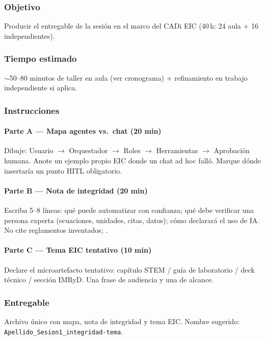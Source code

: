 \subsubsection*{Objetivo}
Producir el entregable de la sesión en el marco del CADi EIC (40\,h: 24 aula + 16 independientes).

\subsubsection*{Tiempo estimado}
$\sim$50--80 minutos de taller en aula (ver cronograma) + refinamiento en trabajo independiente si aplica.

\subsubsection*{Instrucciones}
\paragraph{Parte A --- Mapa agentes vs.\ chat (20 min)} Dibuje: Usuario $\rightarrow$ Orquestador $\rightarrow$ Roles $\rightarrow$ Herramientas $\rightarrow$ Aprobación humana. Anote un ejemplo propio EIC donde un chat ad hoc falló. Marque dónde insertaría un punto HITL obligatorio.
\paragraph{Parte B --- Nota de integridad (20 min)} Escriba 5--8 líneas: qué puede automatizar con confianza; qué debe verificar una persona experta (ecuaciones, unidades, citas, datos); cómo declarará el uso de IA. No cite reglamentos inventados; \ceddie.
\paragraph{Parte C --- Tema EIC tentativo (10 min)} Declare el microartefacto tentativo: capítulo STEM / guía de laboratorio / deck técnico / sección IMRyD. Una frase de audiencia y una de alcance.

\subsubsection*{Entregable}
Archivo único con mapa, nota de integridad y tema EIC. Nombre sugerido: \texttt{Apellido\_Sesion1\_integridad-tema}.

